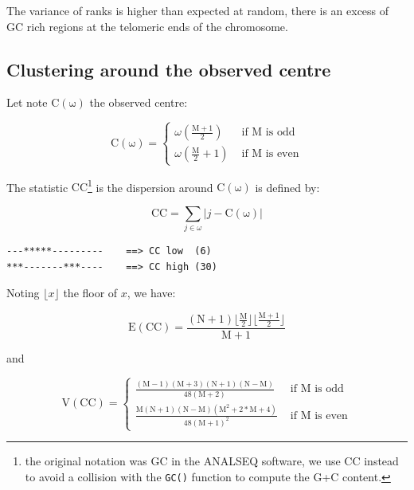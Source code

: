 \documentclass{article}
\begin{document}
The variance of ranks is higher than expected at random, there is an excess of GC rich regions
at the telomeric ends of the chromosome.


\subsection{Clustering around the observed centre}

Let note $\mathrm{C(\omega)}$ the observed centre:

$$
\mathrm{C(\omega)} = \left\{ \begin{array}{rl}
 \omega\left(\mathrm{\frac{M+1}{2}}\right) &\mbox{ if $\mathrm{M}$ is odd} \\
 \omega\left(\mathrm{\frac{M}{2} + 1}\right) &\mbox{ if $\mathrm{M}$ is even}
       \end{array} \right.
$$

The statistic $\mathrm{CC}$\footnote{
the original notation was GC in the ANALSEQ software, we use CC instead to
avoid a collision with the \texttt{GC()} function to compute the G+C content.
} is the dispersion around $\mathrm{C(\omega)}$ is defined by:

$$
\mathrm{CC} = \sum_{j \in \omega}{\left| j - \mathrm{C(\omega)} \right|}
$$

\begin{verbatim}
---*****---------    ==> CC low  (6)
***-------***----    ==> CC high (30)
\end{verbatim}

Noting $\lfloor x \rfloor$ the floor of $x$, we have:

$$
\mathrm{E(CC)} = \mathrm{\frac{(N+1)\lfloor\frac{M}{2}\rfloor\lfloor\frac{M+1}{2}\rfloor}{M+1}}
$$

and

$$
\mathrm{V(CC)} = \left\{ \begin{array}{rl}
 \mathrm{\frac{(M - 1)(M + 3)(N + 1)(N - M)}{48(M + 2)}} &\mbox{ if $\mathrm{M}$ is odd} \\
 \mathrm{\frac{M(N + 1)(N - M)(M^2 + 2*M + 4)}{48(M + 1)^2}} &\mbox{ if $\mathrm{M}$ is even}
       \end{array} \right.
$$
\end{document}
